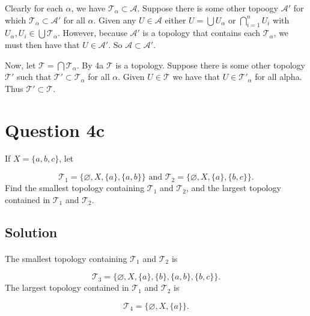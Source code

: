\documentclass[11pt, oneside]{article}   	%
\begin{document}
Clearly for each $\alpha$, we have $\mathscr{T}_\alpha \subset \mathscr{A}$. Suppose there is some other topoogy $\mathscr{A}'$ for which $\mathscr{T}_\alpha \subset \mathscr{A}'$ for all $\alpha$. Given any $U \in \mathscr{A}$ either $U =  \bigcup U_{\alpha}$ or $\bigcap_{i=1}^n U_i$ with $U_\alpha, U_i \in \bigcup \mathscr{T}_\alpha$. However, because $\mathscr{A}'$ is a topology that contains each $\mathscr{T}_\alpha$, we must then have that $U \in \mathscr{A}'$. So $\mathscr{A} \subset \mathscr{A}'$.

Now, let $\mathscr{T} = \bigcap \mathscr{T}_\alpha$. By 4a $\mathscr{T}$ is a topology. Suppose there is some other topology $\mathscr{T}'$ such that $\mathscr{T}' \subset \mathscr{T}_\alpha$ for all $\alpha$. Given $U \in \mathscr{T}$ we have that $U \in \mathscr{T}'_\alpha$ for all alpha. Thus $\mathscr{T}' \subset \mathscr{T}$.


\section*{Question 4c}
If $X = \{a,b,c\}$, let

\[
\mathscr{T}_1 = \{\varnothing, X, \{a\}, \{a,b\}\} \text{ and } \mathscr{T}_2 = \{ \varnothing, X, \{a\}, \{b,c \}\}.
\]
Find the smallest topology containing $ \mathscr{T}_1$ and $\mathscr{T}_2$, and the largest topology contained in $ \mathscr{T}_1$ and $\mathscr{T}_2$.

\subsection*{Solution}
\paragraph{}

The smallest topology containing $ \mathscr{T}_1$ and $\mathscr{T}_2$ is 

\[
\mathscr{T}_3 = \{\varnothing, X, \{a\}, \{b\}, \{a,b\}, \{b,c\} \}.
\]
The largest topology contained in $ \mathscr{T}_1$ and $\mathscr{T}_2$ is

\[
\mathscr{T}_4 = \{\varnothing, X, \{a\} \}.
\]
\end{document}
